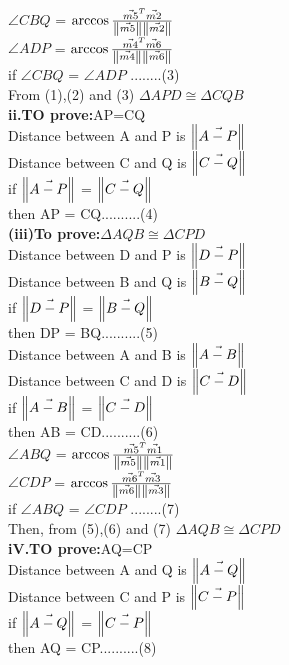 \documentclass[10pt, a4paper]{article}
\begin{document}
	  $\angle {CBQ}$ = $\arccosine\frac{\vec{m5}^T \vec{m2}}{\norm{\vec{m5}}\norm{\vec{m2}}}$ \\
	  $\angle {ADP}$ = $\arccosine\frac{\vec{m4}^T \vec{m6}}{\norm{\vec{m4}}\norm{\vec{m6}}}$ \\
    if $\angle {CBQ}$ = $\angle {ADP}$ ........(3) \\
      From (1),(2) and (3) 
    $\Delta APD \cong \Delta CQB$  \\ 

\textbf{ii.TO prove:}AP=CQ\\
    Distance between A and P is $\norm{\vec{A-P}}$\\
	Distance between C and Q is $\norm{\vec{C-Q}}$\\
	if $\norm{\vec{A-P}}$ =  $\norm{\vec{C-Q}}$\\
	then AP = CQ..........(4)\\

\textbf{(iii)To prove:}$\Delta AQB \cong \Delta CPD$  \\ 
    Distance between D and P is $\norm{\vec{D-P}}$\\
	Distance between B and Q is $\norm{\vec{B-Q}}$\\
	if $\norm{\vec{D-P}}$ =  $\norm{\vec{B-Q}}$\\
	then DP = BQ..........(5)\\

    Distance between A and B is $\norm{\vec{A-B}}$\\
	Distance between C and D is $\norm{\vec{C-D}}$\\
	if $\norm{\vec{A-B}}$ =  $\norm{\vec{C-D}}$\\
	then AB = CD..........(6)\\
	  $\angle {ABQ}$ = $\arccosine\frac{\vec{m5}^T \vec{m1}}{\norm{\vec{m5}}\norm{\vec{m1}}}$ \\
	  $\angle {CDP}$ = $\arccosine\frac{\vec{m6}^T \vec{m3}}{\norm{\vec{m6}}\norm{\vec{m3}}}$ \\
    if $\angle {ABQ}$ = $\angle {CDP}$ ........(7) \\
      Then, from (5),(6) and (7) 
    $\Delta AQB \cong \Delta CPD$  \\ 


\textbf{iV.TO prove:}AQ=CP\\
    Distance between A and Q is $\norm{\vec{A-Q}}$\\
	Distance between C and P is $\norm{\vec{C-P}}$\\
	if $\norm{\vec{A-Q}}$ =  $\norm{\vec{C-P}}$\\
	then AQ = CP..........(8)\\
\end{document}
